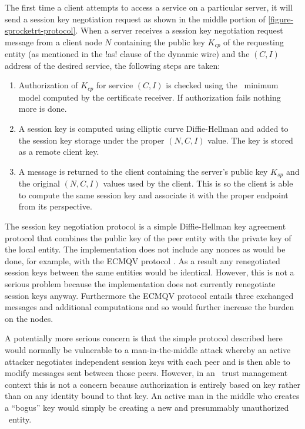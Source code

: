The first time a client attempts to access a service on a particular server, it will send a
session key negotiation request as shown in the middle portion of
\autoref{figure-sprocketrt-protocol}. When a server receives a session key negotiation request
message from a client node $N$ containing the public key $K_{cp}$ of the requesting entity (as
mentioned in the !as! clause of the dynamic wire) and the $(C, I)$ address of the desired
service, the following steps are taken:

\begin{enumerate}
\item Authorization of $K_{cp}$ for service $(C, I)$ is checked using the \RT\ minimum model
  computed by the certificate receiver. If authorization fails nothing more is done.
\item A session key is computed using elliptic curve Diffie-Hellman and added to the session key
  storage under the proper $(N, C, I)$ value. The key is stored as a remote client key.
\item A message is returned to the client containing the server's public key $K_{sp}$ and the
  original $(N, C, I)$ values used by the client. This is so the client is able to compute the
  same session key and associate it with the proper endpoint from its perspective.
\end{enumerate}

The session key negotiation protocol is a simple Diffie-Hellman key agreement protocol that
combines the public key of the peer entity with the private key of the local entity. The
implementation does not include any nonces as would be done, for example, with the ECMQV
protocol \cite{ISO-IEC-1170-3:2008}. As a result any renegotiated session keys between the same
entities would be identical. However, this is not a serious problem because the implementation
does not currently renegotiate session keys anyway. Furthermore the ECMQV protocol entails three
exchanged messages and additional computations and so would further increase the burden on the
nodes.

A potentially more serious concern is that the simple protocol described here would normally be
vulnerable to a man-in-the-middle attack whereby an active attacker negotiates independent
session keys with each peer and is then able to modify messages sent between those peers.
However, in an \RT\ trust management context this is not a concern because authorization is
entirely based on key rather than on any identity bound to that key. An active man in the middle
who creates a ``bogus'' key would simply be creating a new and presummably unauthorized \RT\
entity.

